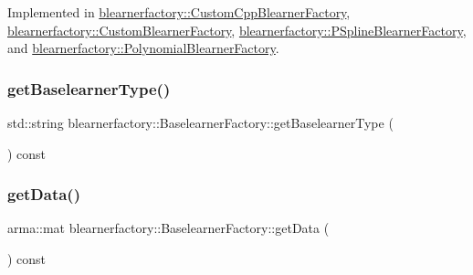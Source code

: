 Implemented in \mbox{\hyperlink{classblearnerfactory_1_1_custom_cpp_blearner_factory_ac98fae043e6822605261c7c6f7125e8c}{blearnerfactory\+::\+Custom\+Cpp\+Blearner\+Factory}}, \mbox{\hyperlink{classblearnerfactory_1_1_custom_blearner_factory_aad915d1ac58a323d1584d27f8cdace56}{blearnerfactory\+::\+Custom\+Blearner\+Factory}}, \mbox{\hyperlink{classblearnerfactory_1_1_p_spline_blearner_factory_a877072332da418456dcbcb27c572c1e7}{blearnerfactory\+::\+P\+Spline\+Blearner\+Factory}}, and \mbox{\hyperlink{classblearnerfactory_1_1_polynomial_blearner_factory_ac0c7f742da0a2de444e91a0cfb0a9384}{blearnerfactory\+::\+Polynomial\+Blearner\+Factory}}.

\mbox{\label{classblearnerfactory_1_1_baselearner_factory_a05d5c00f7a434548868c4ad21d0f5fda}} 
\subsubsection{\texorpdfstring{get\+Baselearner\+Type()}{getBaselearnerType()}}
{\footnotesize\ttfamily std\+::string blearnerfactory\+::\+Baselearner\+Factory\+::get\+Baselearner\+Type (\begin{DoxyParamCaption}{ }\end{DoxyParamCaption}) const}

\mbox{\label{classblearnerfactory_1_1_baselearner_factory_ad9da09739f04e5c8bd268551251801be}} 
\subsubsection{\texorpdfstring{get\+Data()}{getData()}}
{\footnotesize\ttfamily arma\+::mat blearnerfactory\+::\+Baselearner\+Factory\+::get\+Data (\begin{DoxyParamCaption}{ }\end{DoxyParamCaption}) const}

